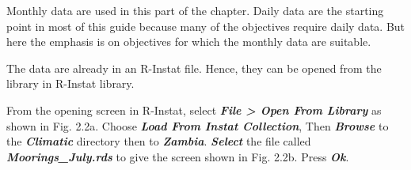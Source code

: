 \documentclass[
  letterpaper,
  DIV=11,
  numbers=noendperiod]{scrreprt}
\begin{document}
Monthly data are used in this part of the chapter. Daily data are the
starting point in most of this guide because many of the objectives
require daily data. But here the emphasis is on objectives for which the
monthly data are suitable.

The data are already in an R-Instat file. Hence, they can be opened from
the library in R-Instat library.

From the opening screen in R-Instat, select \textbf{\emph{File
\textgreater{} Open From Library}} as shown in Fig. 2.2a. Choose
\textbf{\emph{Load From Instat Collection}}, Then \textbf{\emph{Browse}}
to the \textbf{\emph{Climatic}} directory then to
\textbf{\emph{Zambia}}. \textbf{\emph{Select}} the file called
\textbf{\emph{Moorings\_July.rds}} to give the screen shown in Fig.
2.2b. Press \textbf{\emph{Ok}}.
\end{document}

